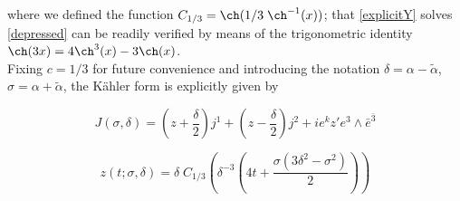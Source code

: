 where we defined the function $C_{1/3} = \ch(1/3 \; \ch^{-1}(x))$; that \ref{explicitY} solves \ref{depressed} can be readily verified by means of the trigonometric identity $\ch(3x) = 4 \ch^3(x) - 3 \ch(x)$.\\

Fixing $c=1/3$ for future convenience and introducing the notation $\delta = \alpha - \tilde{\alpha}$, $\sigma = \alpha + \tilde{\alpha}$, the K\"ahler form is explicitly given by

\begin{equation}
	J(\sigma,\delta) = \left(  z + \frac{\delta}{2}\right) j^1 + \left(z-\frac{\delta}{2}\right) j^2 + ie^k z' e^3 \wedge \bar e^{\bar 3}
	\label{}
\end{equation}

\begin{equation}
	z(t;\sigma,\delta) = \delta \;C_{1/3} \left( \delta^{-3} \left( 4t + \frac{\sigma(3\delta^2 - \sigma^2)}{2} \right) \right)
	\label{}
\end{equation}

~\\\\


